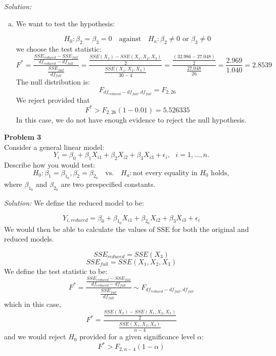 \documentclass{article}
\newenvironment{problem}[2][Problem]
    { \begin{mdframed}[backgroundcolor=gray!20] \textbf{#1 #2} \\}
    {  \end{mdframed}}
\newenvironment{solution}
    {\textit{Solution:}}
    {}
\begin{document}
\begin{solution}
\begin{enumerate}[(a)]
\begin{align*}
{\begin{pmatrix}
-0.014 & 0.115 & -0.012 & -0.052 \\
-0.035 & -0.012 & 0.057 & -0.014 \\
- 0.004 & -0.052 & -0.014 & 0.050
\end{pmatrix} \begin{pmatrix}
1 \\
0 \\
0 \\
0
\end{pmatrix}\right ]}  \\
&= \sqrt{MSE [ 1 +
0.087  ]} \\
&= \sqrt{1.040 (1 + 0.087)} \\
&= 1.0632
\end{align*}
\item We want to test the hypothesis: 

$$H_0 : \beta_2 = \beta_3 = 0 \ \ \ \text{ against } \ \ \ H_a : \beta_2 \not = 0 \text{ or } \beta_3 \not = 0$$
we choose the test statistic: 
$$F^* = \frac{\frac{SSE_{reduced} - SSE_{full}}{df_{reduced} - df_{full}}}{ \frac{SSE_{full}}{df_{full}} } = \frac{\frac{SSE(X_1) - SSE(X_1, X_2, X_3)}{2}}{ \frac{SSE(X_1, X_2, X_3)}{30 - 4}} = \frac{\frac{(32.986 - 27.048)}{2}}{\frac{27.048}{26}} = \frac{2.969}{1.040} = 2.8539$$
The null distribution is: 
$$F_{df_{reduced} - df_{full}, df_{full}} = F_{2, 26}$$
We reject provided that 
$$F^* > F_{2, 26}(1 - 0.01) = 5.526335$$
In this case, we do not have enough evidence to reject the null hypothesis. 
\end{enumerate}
\end{solution}


\begin{problem}{3}
Consider a general linear model:
$$Y_i = \beta_0 + \beta_1 X_{i1}+ \beta_2 X_{i2}+ \beta_3 X_{i3} + \epsilon_i,  \ \ \ i=1,\ldots,n.$$
Describe how you would test:
$$H_0 : \beta_1 = \beta_{1_0}, \beta_2 = \beta_{2_0} \ \ \ \text{ vs. } \ \ \ H_a : \text{not every equality in } H_0 \text{ holds},$$
where $\beta_{1_0}$ and $\beta_{2_0}$ are two prespecified constants.
\end{problem}
\begin{solution}
We define the reduced model to be: 

$$Y_{i, reduced} = \beta_0 + \beta_{1_0} X_{i1}+ \beta_{2_0} X_{i2} +\beta_3 X_{i3} + \epsilon_i $$
We would then be able to calculate the values of SSE for both the original and reduced models. 

$$SSE_{reduced} = SSE(X_3)$$
$$SSE_{full} = SSE(X_1, X_2, X_3)$$
We define the test statistic to be: 
$$F^* = \frac{\frac{SSE_{reduced} - SSE_{full}}{df_{reduced} - df_{full}}}{ \frac{SSE_{full}}{df_{full}} } \sim F_{df_{reduced} - df_{full}, df_{full}}$$
which in this case, 
$$F^* = \frac{\frac{SSE(X_3) - SSE(X_1, X_2, X_3)}{2}}{ \frac{SSE(X_1, X_2, X_3)}{n - 4}}$$
and we would reject $H_0$ provided for a given significance level $\alpha:$
$$F^* > F_{2, n - 4}(1 - \alpha)$$
\end{solution}
\end{document}
